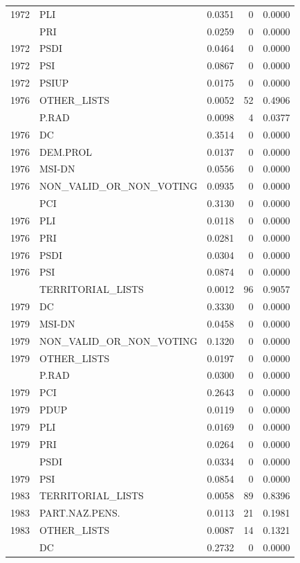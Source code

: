 \begin{longtable}[t]{rlrrr}
1972 & PLI & 0.0351 & 0 & 0.0000\\
\addlinespace
1972 & PRI & 0.0259 & 0 & 0.0000\\
1972 & PSDI & 0.0464 & 0 & 0.0000\\
1972 & PSI & 0.0867 & 0 & 0.0000\\
1972 & PSIUP & 0.0175 & 0 & 0.0000\\
1976 & OTHER\_LISTS & 0.0052 & 52 & 0.4906\\
\addlinespace
1976 & P.RAD & 0.0098 & 4 & 0.0377\\
1976 & DC & 0.3514 & 0 & 0.0000\\
1976 & DEM.PROL & 0.0137 & 0 & 0.0000\\
1976 & MSI-DN & 0.0556 & 0 & 0.0000\\
1976 & NON\_VALID\_OR\_NON\_VOTING & 0.0935 & 0 & 0.0000\\
\addlinespace
1976 & PCI & 0.3130 & 0 & 0.0000\\
1976 & PLI & 0.0118 & 0 & 0.0000\\
1976 & PRI & 0.0281 & 0 & 0.0000\\
1976 & PSDI & 0.0304 & 0 & 0.0000\\
1976 & PSI & 0.0874 & 0 & 0.0000\\
\addlinespace
1979 & TERRITORIAL\_LISTS & 0.0012 & 96 & 0.9057\\
1979 & DC & 0.3330 & 0 & 0.0000\\
1979 & MSI-DN & 0.0458 & 0 & 0.0000\\
1979 & NON\_VALID\_OR\_NON\_VOTING & 0.1320 & 0 & 0.0000\\
1979 & OTHER\_LISTS & 0.0197 & 0 & 0.0000\\
\addlinespace
1979 & P.RAD & 0.0300 & 0 & 0.0000\\
1979 & PCI & 0.2643 & 0 & 0.0000\\
1979 & PDUP & 0.0119 & 0 & 0.0000\\
1979 & PLI & 0.0169 & 0 & 0.0000\\
1979 & PRI & 0.0264 & 0 & 0.0000\\
\addlinespace
1979 & PSDI & 0.0334 & 0 & 0.0000\\
1979 & PSI & 0.0854 & 0 & 0.0000\\
1983 & TERRITORIAL\_LISTS & 0.0058 & 89 & 0.8396\\
1983 & PART.NAZ.PENS. & 0.0113 & 21 & 0.1981\\
1983 & OTHER\_LISTS & 0.0087 & 14 & 0.1321\\
\addlinespace
1983 & DC & 0.2732 & 0 & 0.0000\\

\end{longtable}
